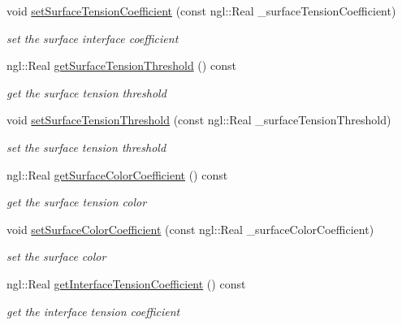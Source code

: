 \begin{DoxyCompactItemize}
void \hyperlink{class_fluid_particle_ab7fc0bcc4a6100ef5110df0c4b0b7486}{setSurfaceTensionCoefficient} (const ngl::Real \_\-surfaceTensionCoefficient)
\begin{DoxyCompactList}\small\item\em set the surface interface coefficient \item\end{DoxyCompactList}\item 
ngl::Real \hyperlink{class_fluid_particle_a76ca06b896d9e30ac34ec6ba9c326835}{getSurfaceTensionThreshold} () const 
\begin{DoxyCompactList}\small\item\em get the surface tension threshold \item\end{DoxyCompactList}\item 
void \hyperlink{class_fluid_particle_abfcb80bf86d94aa6db5add367f388bcf}{setSurfaceTensionThreshold} (const ngl::Real \_\-surfaceTensionThreshold)
\begin{DoxyCompactList}\small\item\em set the surface tension threshold \item\end{DoxyCompactList}\item 
ngl::Real \hyperlink{class_fluid_particle_a367341528345883963d37185513a6983}{getSurfaceColorCoefficient} () const 
\begin{DoxyCompactList}\small\item\em get the surface tension color \item\end{DoxyCompactList}\item 
void \hyperlink{class_fluid_particle_aefabd64a31db41499e71c57baf54bfe5}{setSurfaceColorCoefficient} (const ngl::Real \_\-surfaceColorCoefficient)
\begin{DoxyCompactList}\small\item\em set the surface color \item\end{DoxyCompactList}\item 
ngl::Real \hyperlink{class_fluid_particle_a2487accd86633f52afa8652a9d7b838e}{getInterfaceTensionCoefficient} () const 
\begin{DoxyCompactList}\small\item\em get the interface tension coefficient \item\end{DoxyCompactList}\item 

\end{DoxyCompactItemize}
